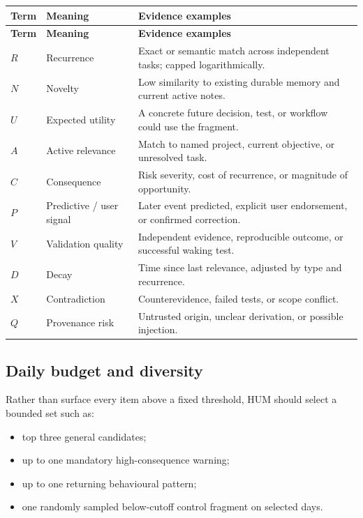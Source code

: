 \documentclass[11pt,a4paper]{article}
\begin{document}
\begin{longtable}{L{0.12\textwidth}L{0.31\textwidth}L{0.49\textwidth}}
\toprule
\textbf{Term} & \textbf{Meaning} & \textbf{Evidence examples} \\
\midrule
\endfirsthead
\toprule
\textbf{Term} & \textbf{Meaning} & \textbf{Evidence examples} \\
\midrule
\endhead
\(R\) & Recurrence & Exact or semantic match across independent tasks; capped logarithmically. \\
\(N\) & Novelty & Low similarity to existing durable memory and current active notes. \\
\(U\) & Expected utility & A concrete future decision, test, or workflow could use the fragment. \\
\(A\) & Active relevance & Match to named project, current objective, or unresolved task. \\
\(C\) & Consequence & Risk severity, cost of recurrence, or magnitude of opportunity. \\
\(P\) & Predictive / user signal & Later event predicted, explicit user endorsement, or confirmed correction. \\
\(V\) & Validation quality & Independent evidence, reproducible outcome, or successful waking test. \\
\(D\) & Decay & Time since last relevance, adjusted by type and recurrence. \\
\(X\) & Contradiction & Counterevidence, failed tests, or scope conflict. \\
\(Q\) & Provenance risk & Untrusted origin, unclear derivation, or possible injection. \\
\bottomrule
\end{longtable}

\subsection{Daily budget and diversity}

Rather than surface every item above a fixed threshold, HUM should select a bounded set such as:

\begin{itemize}
  \item top three general candidates;
  \item up to one mandatory high-consequence warning;
  \item up to one returning behavioural pattern;
  \item one randomly sampled below-cutoff control fragment on selected days.
\end{itemize}
\end{document}
